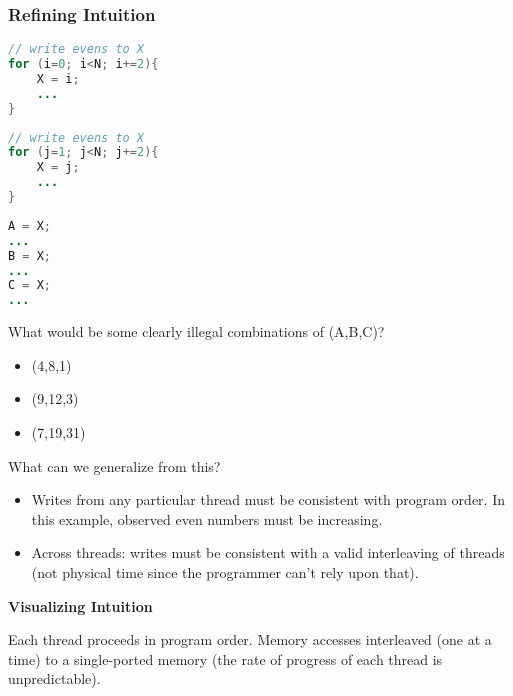\subsubsection{Refining Intuition}
\begin{minipage}{0.33\textwidth}
\begin{tcolorbox}[colback=nightblue!5!white, colframe=nightblue!75!black, title= Thread 0]
    \begin{lstlisting}[label={lst:memhier1}, language=Java, morekeywords={}, numbers=none]
// write evens to X
for (i=0; i<N; i+=2){
    X = i;
    ...
}\end{lstlisting}
\end{tcolorbox}
\end{minipage}
\begin{minipage}{0.33\textwidth}
\begin{tcolorbox}[colback=nightblue!5!white, colframe=nightblue!75!black, title= Thread 1]
    \begin{lstlisting}[label={lst:memhier2}, language=Java, morekeywords={}, numbers=none]
// write evens to X
for (j=1; j<N; j+=2){
    X = j;
    ...
}\end{lstlisting}
\end{tcolorbox}
\end{minipage}
\begin{minipage}{0.33\textwidth}
\begin{tcolorbox}[colback=nightblue!5!white, colframe=nightblue!75!black, title= Thread 2]
    \begin{lstlisting}[label={lst:memhier3}, language=Java, morekeywords={}, numbers=none]
A = X;
...
B = X;
...
C = X;
...\end{lstlisting}
\end{tcolorbox}
\end{minipage}
\par What would be some clearly illegal combinations of (A,B,C)?
\begin{itemize}
    \item (4,8,1) 
    \item (9,12,3)
    \item (7,19,31)
\end{itemize}
\par What can we generalize from this?
\begin{itemize}
    \item Writes from any particular thread must be consistent with program order. In this example, observed even numbers must be increasing.
    \item Across threads: writes must be consistent with a valid interleaving of threads (not physical time since the programmer can't rely upon that).
\end{itemize}
\par {\large \textbf{Visualizing Intuition}}
\par Each thread proceeds in program order. Memory accesses interleaved (one at a time) to a single-ported memory (the rate of progress of each thread is unpredictable).
